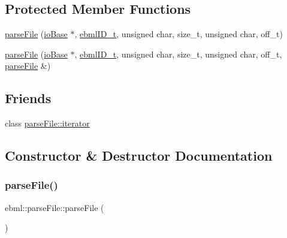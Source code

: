 \subsection*{Protected Member Functions}
\begin{DoxyCompactItemize}
\item 
\mbox{\hyperlink{classebml_1_1parseFile_ae1d5a9baefe4833184ce72703968cc04}{parse\+File}} (\mbox{\hyperlink{classebml_1_1ioBase}{io\+Base}} $\ast$, \mbox{\hyperlink{namespaceebml_a86c5f604ddf12a74aa9812e997a58691}{ebml\+I\+D\+\_\+t}}, unsigned char, size\+\_\+t, unsigned char, off\+\_\+t)
\item 
\mbox{\hyperlink{classebml_1_1parseFile_a9ba34b6b0042dcb30bb69c6e07d8573f}{parse\+File}} (\mbox{\hyperlink{classebml_1_1ioBase}{io\+Base}} $\ast$, \mbox{\hyperlink{namespaceebml_a86c5f604ddf12a74aa9812e997a58691}{ebml\+I\+D\+\_\+t}}, unsigned char, size\+\_\+t, unsigned char, off\+\_\+t, \mbox{\hyperlink{classebml_1_1parseFile}{parse\+File}} \&)
\end{DoxyCompactItemize}
\subsection*{Friends}
\begin{DoxyCompactItemize}
\item 
class \mbox{\hyperlink{classebml_1_1parseFile_a04370d0d5906adeac3988cc70cdc493c}{parse\+File\+::iterator}}
\end{DoxyCompactItemize}


\subsection{Constructor \& Destructor Documentation}
\mbox{\label{classebml_1_1parseFile_addbb25f11021e4a9a1bd0acd90920d3e}} 
\subsubsection{\texorpdfstring{parse\+File()}{parseFile()}\hspace{0.1cm}{\footnotesize\ttfamily [1/10]}}
{\footnotesize\ttfamily ebml\+::parse\+File\+::parse\+File (\begin{DoxyParamCaption}\item[{\mbox{\hyperlink{classebml_1_1ioBase}{io\+Base}} $\ast$}]{ }\end{DoxyParamCaption})}


